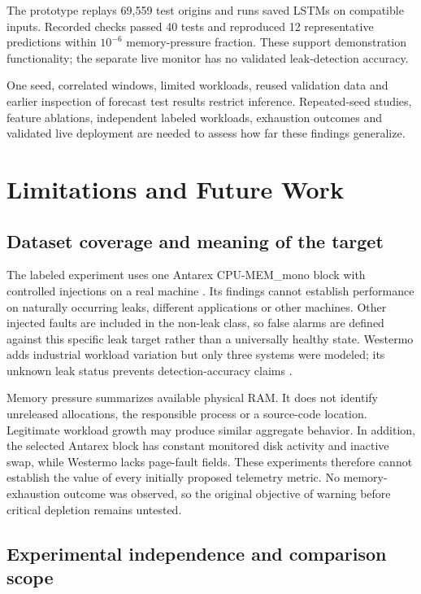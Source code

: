 \documentclass[10pt,a4paper,twocolumn]{article}
\begin{document}
The prototype replays 69,559 test origins and runs saved LSTMs on compatible inputs. Recorded checks passed 40 tests and reproduced 12 representative predictions within $10^{-6}$ memory-pressure fraction. These support demonstration functionality; the separate live monitor has no validated leak-detection accuracy.

One seed, correlated windows, limited workloads, reused validation data and earlier inspection of forecast test results restrict inference. Repeated-seed studies, feature ablations, independent labeled workloads, exhaustion outcomes and validated live deployment are needed to assess how far these findings generalize.

\section{Limitations and Future Work}

\subsection{Dataset coverage and meaning of the target}

The labeled experiment uses one Antarex CPU-MEM\_mono block with controlled injections on a real machine \cite{ref3,ref4,ref5}. Its findings cannot establish performance on naturally occurring leaks, different applications or other machines. Other injected faults are included in the non-leak class, so false alarms are defined against this specific leak target rather than a universally healthy state. Westermo adds industrial workload variation but only three systems were modeled; its unknown leak status prevents detection-accuracy claims \cite{ref6}.

Memory pressure summarizes available physical RAM. It does not identify unreleased allocations, the responsible process or a source-code location. Legitimate workload growth may produce similar aggregate behavior. In addition, the selected Antarex block has constant monitored disk activity and inactive swap, while Westermo lacks page-fault fields. These experiments therefore cannot establish the value of every initially proposed telemetry metric. No memory-exhaustion outcome was observed, so the original objective of warning before critical depletion remains untested.

\subsection{Experimental independence and comparison scope}
\end{document}
